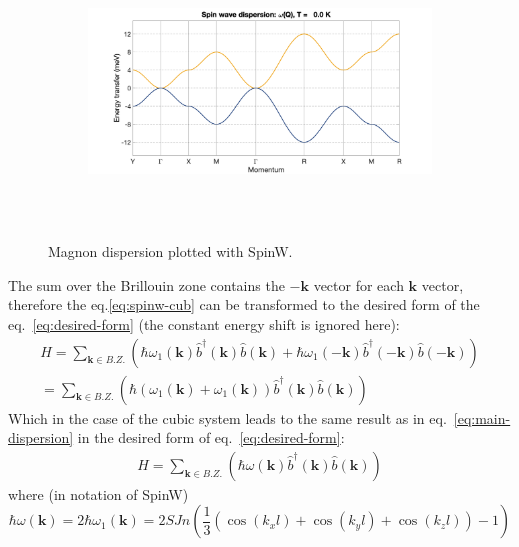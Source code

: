 \documentclass[a4paper,12pt]{article}
\begin{document}
        \begin{figure}[H]
            \centering
            \begin{subfigure}[b]{0.8\textwidth}
                \centering
                \includegraphics[height=7cm]{spinw-cub.png}
            \end{subfigure}
            \hfill
            \caption{Magnon dispersion plotted with SpinW.}
            \label{fig:spinw-cub}
        \end{figure}

        The sum over the Brillouin zone contains the $-\mathbf{k}$ vector for each $\mathbf{k}$ vector, 
        therefore the eq.\eqref{eq:spinw-cub} can be transformed to the desired form of the eq.~\eqref{eq:desired-form} (the constant energy shift is ignored here):
        \begin{equation}
            \begin{aligned}
                H = \sum_{\mathbf{k} \in B.Z.}\left(\hbar\omega_1(\mathbf{k})\hat{b}^{\dag}(\mathbf{k})\hat{b}(\mathbf{k}) 
                + \hbar\omega_1(-\mathbf{k})\hat{b}^{\dag}(\mathbf{-k})\hat{b}(\mathbf{-k})\right)\\ 
                = \sum_{\mathbf{k} \in B.Z.}\left(\hbar(\omega_1(\mathbf{k}) + \omega_1(\mathbf{k}))\hat{b}^{\dag}(\mathbf{k})\hat{b}(\mathbf{k})\right)
            \end{aligned}
        \end{equation}
        Which in the case of the cubic system leads to the same result as in eq.~\eqref{eq:main-dispersion} in the desired form of eq.~\eqref{eq:desired-form}:
        \begin{equation}
            \begin{aligned}
                H = \sum_{\mathbf{k} \in B.Z.}\left(\hbar\omega(\mathbf{k})\hat{b}^{\dag}(\mathbf{k})\hat{b}(\mathbf{k})\right)
            \end{aligned}
        \end{equation}
        where (in notation of SpinW)
        \begin{equation}
            \hbar\omega(\mathbf{k}) = 2\hbar \omega_1(\mathbf{k}) = 2SJn\left(\dfrac{1}{3}\left(\cos(k_xl) + \cos(k_yl) + \cos(k_zl)\right) - 1\right)
        \end{equation}
\end{document}
